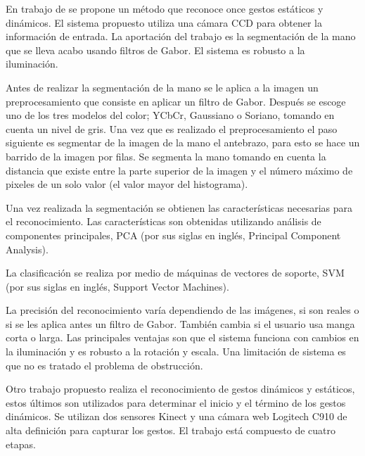 
En trabajo de \citep{Huang2011} se propone un método que reconoce once gestos estáticos y dinámicos. El sistema propuesto utiliza una cámara CCD para obtener la información de entrada. La aportación del trabajo es la segmentación de la mano que se lleva acabo usando filtros de Gabor. El sistema es robusto a la iluminación. 
 
Antes de realizar la segmentación de la mano se le aplica a la imagen un preprocesamiento que consiste en aplicar un filtro de Gabor. Después se escoge uno de los tres modelos del color; YCbCr, Gaussiano o Soriano, tomando en cuenta un nivel de gris.  
Una vez que es realizado el preprocesamiento el paso siguiente es segmentar de la imagen de la mano el antebrazo, para esto se hace un barrido de la imagen por filas. Se segmenta la mano tomando en cuenta la distancia que existe entre la parte superior de la imagen y el número máximo de pixeles de un solo valor (el valor mayor del histograma).

Una vez realizada la segmentación se obtienen las características necesarias para el reconocimiento. Las características son obtenidas utilizando análisis de componentes principales, PCA (por sus siglas en inglés, Principal Component Analysis).

La clasificación se realiza por medio de máquinas de vectores de soporte, SVM (por sus siglas en inglés, Support Vector Machines).   

La precisión del reconocimiento varía dependiendo de las imágenes, si son reales o si se les aplica antes un filtro de Gabor. También cambia si el usuario usa manga corta o larga.  
Las principales ventajas son que el sistema funciona con cambios en la iluminación y es robusto a la rotación y escala. Una limitación de sistema es que no es tratado el problema de obstrucción. 


Otro trabajo propuesto \citep{Caputo2012} realiza el reconocimiento de  gestos dinámicos y estáticos, estos últimos son utilizados para determinar el inicio y el término de los gestos dinámicos. Se utilizan dos sensores Kinect y una cámara web Logitech C910 de alta definición para capturar los gestos. El trabajo está compuesto de cuatro etapas.

